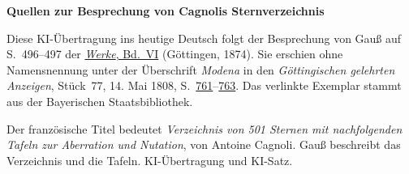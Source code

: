 \clearpage\thispagestyle{empty}
\begin{center}\textbf{Quellen zur Besprechung von Cagnolis Sternverzeichnis}\end{center}
\noindent Diese KI-Übertragung ins heutige Deutsch folgt der Besprechung von Gauß auf S.~496--497 der \href{https://gdz.sub.uni-goettingen.de/id/PPN236007467}{\textit{Werke}, Bd.~VI} (Göttingen, 1874). Sie erschien ohne Namensnennung unter der Überschrift \emph{Modena} in den \textit{Göttingischen gelehrten Anzeigen}, Stück~77, 14. Mai 1808, S.~\href{https://api.digitale-sammlungen.de/iiif/image/v2/bsb10538673_00767/full/1800,/0/default.jpg}{761}--\href{https://api.digitale-sammlungen.de/iiif/image/v2/bsb10538673_00769/full/1800,/0/default.jpg}{763}. Das verlinkte Exemplar stammt aus der Bayerischen Staatsbibliothek.
\par\smallskip\noindent Der französische Titel bedeutet \emph{Verzeichnis von 501 Sternen mit nachfolgenden Tafeln zur Aberration und Nutation}, von Antoine Cagnoli. Gauß beschreibt das Verzeichnis und die Tafeln. KI-Übertragung und KI-Satz.
\clearpage

